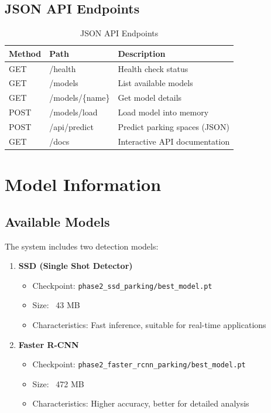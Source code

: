 \documentclass[12pt,a4paper]{article}
\begin{document}
\subsection{JSON API Endpoints}
\begin{table}[H]
\centering
\begin{tabular}{lll}
\toprule
\textbf{Method} & \textbf{Path} & \textbf{Description} \\
\midrule
GET & /health & Health check status \\
GET & /models & List available models \\
GET & /models/\{name\} & Get model details \\
POST & /models/load & Load model into memory \\
POST & /api/predict & Predict parking spaces (JSON) \\
GET & /docs & Interactive API documentation \\
\bottomrule
\end{tabular}
\caption{JSON API Endpoints}
\end{table}

\section{Model Information}

\subsection{Available Models}
The system includes two detection models:

\begin{enumerate}
    \item \textbf{SSD (Single Shot Detector)}
    \begin{itemize}
        \item Checkpoint: \texttt{phase2\_ssd\_parking/best\_model.pt}
        \item Size: ~43 MB
        \item Characteristics: Fast inference, suitable for real-time applications
    \end{itemize}
    
    \item \textbf{Faster R-CNN}
    \begin{itemize}
        \item Checkpoint: \texttt{phase2\_faster\_rcnn\_parking/best\_model.pt}
        \item Size: ~472 MB
        \item Characteristics: Higher accuracy, better for detailed analysis
    \end{itemize}
\end{enumerate}
\end{document}
